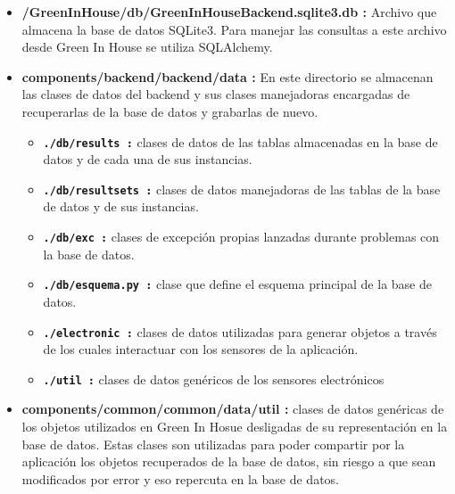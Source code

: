         \begin{itemize}
            \item \textbf{/GreenInHouse/db/GreenInHouseBackend.sqlite3.db :} Archivo que almacena la base de datos SQLite3. Para manejar las consultas a este archivo desde Green In House se utiliza SQLAlchemy.
            \item \textbf{components/backend/backend/data :} En este directorio se almacenan las clases de datos del backend y sus clases manejadoras encargadas de recuperarlas de la base de datos y grabarlas de nuevo.
            \begin{itemize}
                \item \textbf{\texttt{./db/results :}} clases de datos de las tablas almacenadas en la base de datos y de cada una de sus instancias.
                \item \textbf{\texttt{./db/resultsets :}} clases de datos manejadoras de las tablas de la base de datos y de sus instancias.
                \item \textbf{\texttt{./db/exc :}} clases de excepción propias lanzadas durante problemas con la base de datos.
                \item \textbf{\texttt{./db/esquema.py :}} clase que define el esquema principal de la base de datos.
                \item \textbf{\texttt{./electronic :}} clases de datos utilizadas para generar objetos a través de los cuales interactuar con los sensores de la aplicación.
                \item \textbf{\texttt{./util :}} clases de datos genéricos de los sensores electrónicos
            \end{itemize}
            \item \textbf{components/common/common/data/util :} clases de datos genéricas de los objetos utilizados en Green In Hosue desligadas de su representación en la base de datos. Estas clases son utilizadas para poder compartir por la aplicación los objetos recuperados de la base de datos, sin riesgo a que sean modificados por error y eso repercuta en la base de datos.
        \end{itemize}  
        

